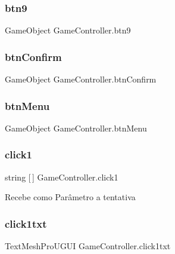 \mbox{\label{class_game_controller_ad9706c29ad490faf8afca7ccbc1f4c98}} 
\subsubsection{btn9}
{\footnotesize\ttfamily Game\+Object Game\+Controller.\+btn9}

\mbox{\label{class_game_controller_a0b81ac531da6c5493a36535cb4a7339b}} 
\subsubsection{btnConfirm}
{\footnotesize\ttfamily Game\+Object Game\+Controller.\+btn\+Confirm}

\mbox{\label{class_game_controller_a49d4faa8705baa1eb080b377ba635a69}} 
\subsubsection{btnMenu}
{\footnotesize\ttfamily Game\+Object Game\+Controller.\+btn\+Menu}

\mbox{\label{class_game_controller_a1d2ccb048f9ceda40ed2747722a4c362}} 
\subsubsection{click1}
{\footnotesize\ttfamily string [$\,$] Game\+Controller.\+click1}

Recebe como Parâmetro a tentativa \mbox{\label{class_game_controller_ab6fcf4c5c69e4aa424d073626a5987fa}} 
\subsubsection{click1txt}
{\footnotesize\ttfamily Text\+Mesh\+Pro\+U\+G\+UI Game\+Controller.\+click1txt}

\mbox{\label{class_game_controller_af076b749d817c413910c1dd1a024bb09}} 
